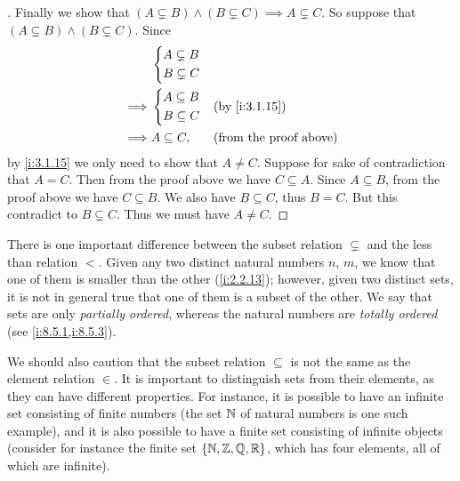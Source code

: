 \begin{proof}[]
  Finally we show that \((A \subsetneq B) \land (B \subsetneq C) \implies A \subsetneq C\).
  So suppose that  \((A \subsetneq B) \land (B \subsetneq C)\).
  Since
  \begin{align*}
             & \begin{dcases}
                 A \subsetneq B \\
                 B \subsetneq C
               \end{dcases}                                       \\
    \implies & \begin{dcases}
                 A \subseteq B \\
                 B \subseteq C
               \end{dcases}  &  & \by{i:3.1.15}                     \\
    \implies & A \subseteq C,    &  & \text{(from the proof above)}
  \end{align*}
  by \cref{i:3.1.15} we only need to show that \(A \neq C\).
  Suppose for sake of contradiction that \(A = C\).
  Then from the proof above we have \(C \subseteq A\).
  Since \(A \subseteq B\), from the proof above we have \(C \subseteq B\).
  We also have \(B \subseteq C\), thus \(B = C\).
  But this contradict to \(B \subsetneq C\).
  Thus we must have \(A \neq C\).
\end{proof}

\setcounter{thm}{19}
\begin{rmk}\label{i:3.1.20}
  There is one important difference between the subset relation \(\subsetneq\) and the less than relation \(<\).
  Given any two distinct natural numbers \(n\), \(m\), we know that one of them is smaller than the other (\cref{i:2.2.13});
  however, given two distinct sets, it is not in general true that one of them is a subset of the other.
  We say that sets are only \emph{partially ordered}, whereas the natural numbers are \emph{totally ordered} (see \cref{i:8.5.1,i:8.5.3}).
\end{rmk}

\begin{rmk}\label{i:3.1.21}
  We should also caution that the subset relation \(\subseteq\) is not the same as the element relation \(\in\).
  It is important to distinguish sets from their elements, as they can have different properties.
  For instance, it is possible to have an infinite set consisting of finite numbers (the set \(\mathbb{N}\) of natural numbers is one such example), and it is also possible to have a finite set consisting of infinite objects
  (consider for instance the finite set \(\left\lbrace\mathbb{N}, \mathbb{Z}, \mathbb{Q}, \mathbb{R}\right\rbrace\), which has four elements, all of which are infinite).
\end{rmk}

